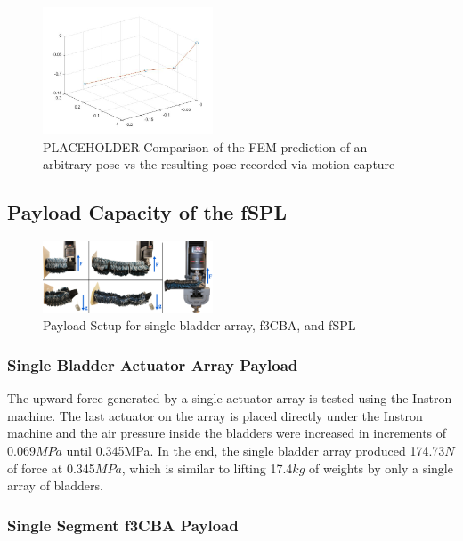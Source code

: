 \documentclass[letterpaper, 10 pt, conference]{ieeeconf}  %
\begin{document}
\begin{figure}[t!]
\centering
\includegraphics[width=0.45\textwidth]{Figures/SnakePose.jpg}
\caption{PLACEHOLDER Comparison of the FEM prediction of an arbitrary pose vs the resulting pose recorded via motion capture}
\label{fig:pose}
\end{figure}



\subsection{Payload Capacity of the fSPL}


\begin{figure}[t!]
\centering
\includegraphics[width=0.45\textwidth]{Figures/payload_all_v2}
\caption{Payload Setup for single bladder array, f3CBA, and fSPL}
\label{fig:payload_all}
\vspace{-1.5em}
\end{figure}


\subsubsection{Single Bladder Actuator Array Payload}
The upward force generated by a single actuator array is tested using the Instron machine. The last actuator on the array is placed directly under the Instron machine and the air pressure inside the bladders were increased in increments of 0.069$MPa$ until 0.345MPa. In the end, the single bladder array produced 174.73$N$ of force at 0.345$MPa$, which is similar to lifting 17.4$kg$ of weights by only a single array of bladders.

\subsubsection{Single Segment f3CBA Payload}
\end{document}
